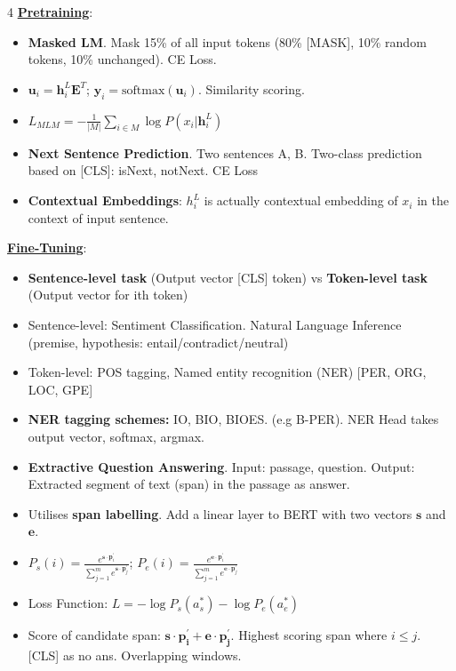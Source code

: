 \documentclass[10pt, landscape]{article}
\begin{document}
\begin{multicols*}{4}
  \textbf{\underline{Pretraining}}:
  \begin{itemize}
    \item \textbf{Masked LM}. Mask 15\% of all input tokens (80\% [MASK], 10\% random tokens, 10\% unchanged). CE Loss.
    \item $\mathbf{u}_i = \mathbf{h}^L_i \mathbf{E}^T$; $\mathbf{y}_i = \text{softmax}(\mathbf{u}_i)$. Similarity scoring.
    \item $L_{MLM} = - \frac{1}{|M|} \sum_{i \in M} \log P (x_i | \mathbf{h}_i^L)$
    \item \textbf{Next Sentence Prediction}. Two sentences A, B. Two-class prediction based on [CLS]: isNext, notNext. CE Loss
    \item \textbf{Contextual Embeddings}: $h_i^L$ is actually contextual embedding of $x_i$ in the context of input sentence.
  \end{itemize}
  \textbf{\underline{Fine-Tuning}}:
  \begin{itemize}
    \item \textbf{Sentence-level task} (Output vector [CLS] token) vs \textbf{Token-level task} (Output vector for ith token)
    \item Sentence-level: Sentiment Classification. Natural Language Inference (premise, hypothesis: entail/contradict/neutral)
    \item Token-level: POS tagging, Named entity recognition (NER) [PER, ORG, LOC, GPE]
    \item \textbf{NER tagging schemes:} IO, BIO, BIOES. (e.g B-PER). NER Head takes output vector, softmax, argmax.
    \item \textbf{Extractive Question Answering}. Input: passage, question. Output: Extracted segment of text (span) in the passage as answer.
    \item Utilises \textbf{span labelling}. Add a linear layer to BERT with two vectors $\mathbf{s}$ and $\mathbf{e}$.
    \item $P_s(i) = \frac{e^{\mathbf{s} \cdot \mathbf{p}_i^{'}}}{\sum_{j=1}^m e^{\mathbf{s} \cdot \mathbf{p}_j^{'}}}$; $P_e(i) = \frac{e^{\mathbf{e} \cdot \mathbf{p}_i^{'}}}{\sum_{j=1}^m e^{\mathbf{e} \cdot \mathbf{p}_j^{'}}}$
    \item Loss Function: $L = - \log P_s(a_s^*) - \log P_e(a_e^{*})$
    \item Score of candidate span: $\mathbf{s \cdot p_i^{'} + e \cdot p_j^{'}}$. Highest scoring span where $i \leq j$. [CLS] as no ans. Overlapping windows.
  \end{itemize}


\end{multicols*}
\end{document}
